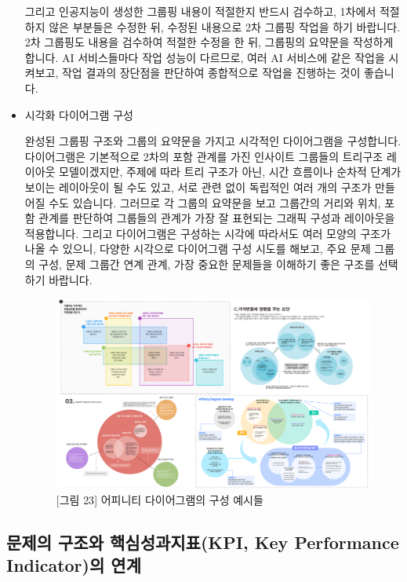 \documentclass[
  letterpaper,
]{book}
\begin{document}
\begin{itemize}
  그리고 인공지능이 생성한 그룹핑 내용이 적절한지 반드시 검수하고,
  1차에서 적절하지 않은 부분들은 수정한 뒤, 수정된 내용으로 2차 그룹핑
  작업을 하기 바랍니다. 2차 그룹핑도 내용을 검수하여 적절한 수정을 한
  뒤, 그룹핑의 요약문을 작성하게 합니다. AI 서비스들마다 작업 성능이
  다르므로, 여러 AI 서비스에 같은 작업을 시켜보고, 작업 결과의 장단점을
  판단하여 종합적으로 작업을 진행하는 것이 좋습니다.
\item
  시각화 다이어그램 구성

  완성된 그룹핑 구조와 그룹의 요약문을 가지고 시각적인 다이어그램을
  구성합니다. 다이어그램은 기본적으로 2차의 포함 관계를 가진 인사이트
  그룹들의 트리구조 레이아웃 모델이겠지만, 주제에 따라 트리 구조가 아닌,
  시간 흐름이나 순차적 단계가 보이는 레이아웃이 될 수도 있고, 서로 관련
  없이 독립적인 여러 개의 구조가 만들어질 수도 있습니다. 그러므로 각
  그룹의 요약문을 보고 그룹간의 거리와 위치, 포함 관계를 판단하여
  그룹들의 관계가 가장 잘 표현되는 그래픽 구성과 레이아웃을 적용합니다.
  그리고 다이어그램은 구성하는 시각에 따라서도 여러 모양의 구조가 나올
  수 있으니, 다양한 시각으로 다이어그램 구성 시도를 해보고, 주요 문제
  그룹의 구성, 문제 그룹간 연계 관계, 가장 중요한 문제들을 이해하기 좋은
  구조를 선택하기 바랍니다.

  \begin{figure}[H]

  {\centering \includegraphics{img/fig23.png}

  }

  \caption{{[}그림 23{]} 어피니티 다이어그램의 구성 예시들}

  \end{figure}%
\end{itemize}

\subsection{문제의 구조와 핵심성과지표(KPI, Key Performance Indicator)의
연계}\label{uxbb38uxc81cuxc758-uxad6cuxc870uxc640-uxd575uxc2ecuxc131uxacfcuxc9c0uxd45ckpi-key-performance-indicatoruxc758-uxc5f0uxacc4}
\end{document}
